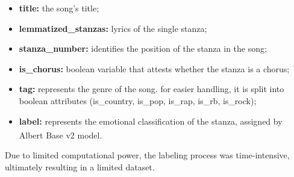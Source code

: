 \begin{itemize}
    \item \textbf{title:} the song's title;

    \item \textbf{lemmatized\_stanzas:} lyrics of the single stanza;
    
    \item \textbf{stanza\_number:} identifies the position of the stanza in the song;

    \item \textbf{is\_chorus:} boolean variable that attests whether the stanza is
        a chorus;
    
    \item \textbf{tag:} represents the genre of the song. for easier handling,
        it is split into boolean attributes
        (is\_country, is\_pop, is\_rap, is\_rb, is\_rock);

    \item \textbf{label:} represents the emotional classification of the stanza,
        assigned by Albert Base v2\textsuperscript{\cite{albert-base-v2}} model.
    
\end{itemize}

Due to limited computational power, the labeling process was time-intensive,
ultimately resulting in a limited dataset.\\